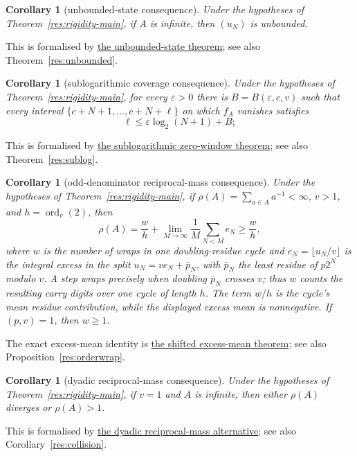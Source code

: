 \documentclass[11pt]{article}
\newcommand{\commit}{99f4bf47422abbd8757cbb22b50ba079d764d3a7}
\newcommand{\repobase}{https://github.com/wcook04/plectis-erdos/blob/\commit}
\newcommand{\PK}{Erdos249257}
\newcommand{\lword}[4]{\href{\repobase/\PK/#1\#L#2}{#4}}
\newtheorem{corollary}[theorem]{Corollary}
\theoremstyle{definition}
\theoremstyle{remark}
\begin{document}
\begin{corollary}[unbounded-state consequence]
\label{res:rigidity-unbounded-main}
Under the hypotheses of Theorem~\ref{res:rigidity-main}, if \(A\) is
infinite, then \((u_N)\) is unbounded.
\end{corollary}
\noindent This is formalised by
\lword{RationalSupportCarrySkeleton.lean}{2383}{exists_unbounded_shifted_odd_tail_nat_state_of_support_fraction}{the unbounded-state theorem};
see also Theorem~\ref{res:unbounded}.

\begin{corollary}[sublogarithmic coverage consequence]
\label{res:rigidity-sublog-main}
Under the hypotheses of Theorem~\ref{res:rigidity-main}, for every
\(\varepsilon>0\) there is
\(B=B(\varepsilon,c,v)\) such that every interval
\(\{c+N+1,\ldots,c+N+\ell\}\) on which \(f_A\) vanishes satisfies
\[
 \ell\leq\varepsilon\log_2(N+1)+B;
\]
\end{corollary}
\noindent This is formalised by
\lword{SublogDivisorCoverage.lean}{392}{supportCoeffZeroWindow_length_le_eps_logb_add}{the sublogarithmic zero-window theorem};
see also Theorem~\ref{res:sublog}.

\begin{corollary}[odd-denominator reciprocal-mass consequence]
\label{res:rigidity-mass-main}
Under the hypotheses of Theorem~\ref{res:rigidity-main}, if
\(\rho(A)=\sum_{a\in A}a^{-1}<\infty\), \(v>1\), and
\(h=\operatorname{ord}_v(2)\), then
\[
 \rho(A)=\frac{w}{h}
   +\lim_{M\to\infty}\frac1M\sum_{N<M}e_N\geq\frac{w}{h},
\]
where \(w\) is the number of wraps in one doubling-residue cycle and
\(e_N=\lfloor u_N/v\rfloor\) is the integral excess in the split
\(u_N=ve_N+\bar p_N\), with \(\bar p_N\) the least residue of
\(p2^N\) modulo \(v\).  A step wraps precisely when doubling
\(\bar p_N\) crosses \(v\); thus \(w\) counts the resulting carry digits
over one cycle of length \(h\).  The term \(w/h\) is the cycle's mean
residue contribution, while the displayed excess mean is nonnegative.  If
\((p,v)=1\), then \(w\geq1\).
\end{corollary}
\noindent The exact excess-mean identity is
\lword{RationalSupportCarrySkeleton.lean}{1579}{exists_shifted_oddTailExcess_mean_of_support_fraction}{the shifted excess-mean theorem};
see also Proposition~\ref{res:orderwrap}.

\begin{corollary}[dyadic reciprocal-mass consequence]
\label{res:rigidity-dyadic-mass-main}
Under the hypotheses of Theorem~\ref{res:rigidity-main}, if \(v=1\) and
\(A\) is infinite, then either \(\rho(A)\) diverges or \(\rho(A)>1\).
\end{corollary}
\noindent This is formalised by
\lword{RationalSupportCarrySkeleton.lean}{2210}{dyadic_support_fraction_reciprocalMass_diverges_or_gt_one}{the dyadic reciprocal-mass alternative};
see also Corollary~\ref{res:collision}.
\end{document}
